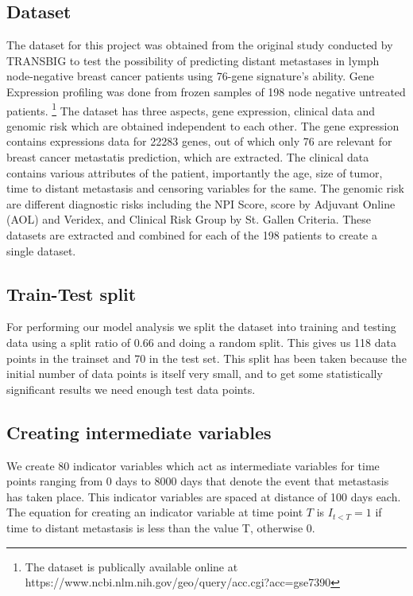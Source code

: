 \documentclass[13pt]{article}
\begin{document}
\subsection{Dataset}
The dataset for this project was obtained from the original study conducted by TRANSBIG to test the possibility of predicting distant metastases in lymph node-negative breast cancer patients using 76-gene signature's ability. Gene Expression profiling was done from frozen samples of 198 node negative untreated patients.  \footnote{The dataset is publically available online at https://www.ncbi.nlm.nih.gov/geo/query/acc.cgi?acc=gse7390} The dataset has three aspects, gene expression, clinical data and genomic risk which are obtained independent to each other. The gene expression contains expressions data for 22283 genes, out of which only 76 are relevant for breast cancer metastatis prediction, which are extracted. The clinical data contains various attributes of the patient, importantly the age, size of tumor, time to distant metastasis and censoring variables for the same. The genomic risk are different diagnostic risks including the NPI Score, score by Adjuvant Online (AOL) and Veridex, and Clinical Risk Group by St. Gallen Criteria. These datasets are extracted and combined for each of the 198 patients to create a single dataset. 




\subsection{Train-Test split}
For performing our model analysis we split the dataset into training and testing data using a split ratio of 0.66 and doing a random split. This gives us 118 data points in the trainset and 70 in the test set. This split has been taken because the initial number of data points is itself very small, and to get some statistically significant results we need enough test data points.   

\subsection{Creating intermediate variables}
We create 80 indicator variables which act as intermediate variables for time points ranging from 0 days to 8000 days that denote the event that metastasis has taken place. This indicator variables are spaced at distance of 100 days each.\\


The equation for creating an indicator variable at time point $T$ is $I_{t < T} = 1$ if time to distant metastasis is less than the value T, otherwise 0.\\
\end{document}
